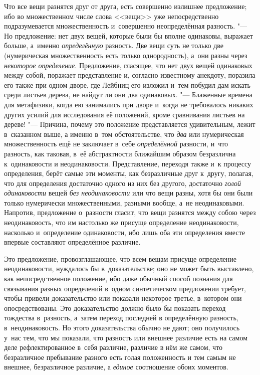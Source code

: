 Что все вещи разнятся друг от друга, есть совершенно излишнее предложение;
ибо во множественном числе слова <<вещи>> уже непосредственно подразумевается
множественность и~совершенно неопределённая разность. "--- Но предложение: нет
двух вещей, которые были бы вполне одинаковы, выражает больше, а~именно
{\em определённую} разность. Две вещи суть не только
две (нумерическая множественность есть только однородность), а~они разны
через {\em некоторое определение}. Предложение,
гласящее, что нет двух вещей одинаковых между собой, поражает представление
и, согласно известному анекдоту, поразила его также при одном дворе, где
Лейбниц его изложил и~тем побудил дам искать среди листьев дерева, не
найдут ли они два одинаковых. "--- Блаженные времена для метафизики, когда ею
занимались при дворе и~когда не требовалось никаких других усилий для
исследования её положений, кроме сравнивания листьев на дереве! "--- Причина,
почему это положение представляется удивительным, лежит в~сказанном выше, а
именно в~том обстоятельстве, что {\em два} или
нумерическая множественность ещё не заключает в~себе
{\em определённой} разности, и~что разность, как
таковая, в~её абстрактности ближайшим образом безразлична к~одинаковости и
неодинаковости. Представление, переходя также и~к процессу определения,
берёт самые эти моменты, как безразличные друг к~другу, полагая, что для
определения достаточно одного из них без другого, достаточно
{\em голой одинаковости} вещей
{\em без неодинаковости} или что вещи разны, хотя бы
они были только нумерически множественными, разными вообще, а~не
неодинаковыми. Напротив, предложение о~разности гласит, что вещи разнятся
между собою через неодинаковость, что им настолько же присуще определение
неодинаковости, насколько и~определение одинаковости, ибо лишь оба эти
определения вместе впервые составляют определённое различие.

Это предложение, провозглашающее, что всем вещам присуще определение
неодинаковости, нуждалось бы в~доказательстве; оно не может быть
выставлено, как непосредственное положение, ибо даже обычный способ
познания для связывания разных определений в~одном синтетическом
предложении требует, чтобы привели доказательство или показали некоторое
третье, в~котором они опосредствованы. Это доказательство должно было бы
показать переход тождества в~разность, а~затем переход последней в
определённую разность, в~неодинаковость. Но этого доказательства обычно не
дают; оно получилось у~нас тем, что мы показали, что разность или внешнее
различие есть на самом деле рефлектированное в~себя различие, различие в
нём же самом, что безразличное пребывание разного есть голая положенность и
тем самым не внешнее, безразличное различие, а
{\em единое} соотношение обоих моментов.

